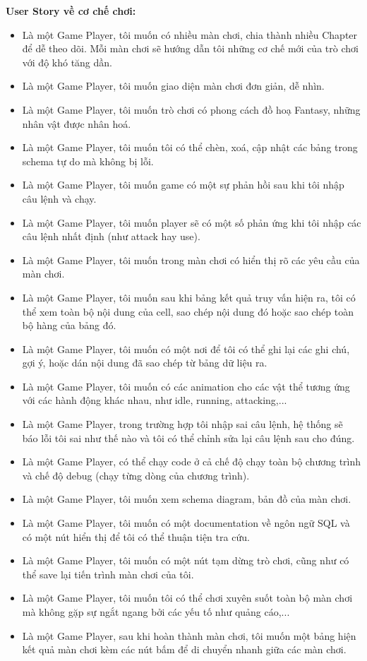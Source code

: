\textbf{User Story về cơ chế chơi:}
\begin{itemize}
	\item Là một Game Player, tôi muốn có nhiều màn chơi, chia thành nhiều Chapter để dễ theo dõi. Mỗi màn chơi sẽ hướng dẫn tôi những cơ chế mới của trò chơi với độ khó tăng dần.
	\item Là một Game Player, tôi muốn giao diện màn chơi đơn giản, dễ nhìn.
	\item Là một Game Player, tôi muốn trò chơi có phong cách đồ hoạ Fantasy, những nhân vật được nhân hoá.
	\item Là một Game Player, tôi muốn tôi có thể chèn, xoá, cập nhật các bảng trong schema tự do mà không bị lỗi.
	\item Là một Game Player, tôi muốn game có một sự phản hồi sau khi tôi nhập câu lệnh và chạy.
	\item Là một Game Player, tôi muốn player sẽ có một số phản ứng khi tôi nhập các câu lệnh nhất định (như attack hay use).
	\item Là một Game Player, tôi muốn trong màn chơi có hiển thị rõ các yêu cầu của màn chơi.
	\item Là một Game Player, tôi muốn sau khi bảng kết quả truy vấn hiện ra, tôi có thể xem toàn bộ nội dung của cell, sao chép nội dung đó hoặc sao chép toàn bộ hàng của bảng đó.
	\item Là một Game Player, tôi muốn có một nơi để tôi có thể ghi lại các ghi chú, gợi ý, hoặc dán nội dung đã sao chép từ bảng dữ liệu ra.
	\item Là một Game Player, tôi muốn có các animation cho các vật thể tương ứng với các hành động khác nhau, như idle, running, attacking,...
	\item Là một Game Player, trong trường hợp tôi nhập sai câu lệnh, hệ thống sẽ báo lỗi tôi sai như thế nào và tôi có thể chỉnh sửa lại câu lệnh sau cho đúng. 
	\item Là một Game Player, có thể chạy code ở cả chế độ chạy toàn bộ chương trình và chế độ debug (chạy từng dòng của chương trình).
	\item Là một Game Player, tôi muốn xem schema diagram, bản đồ của màn chơi.
	\item Là một Game Player, tôi muốn có một documentation về ngôn ngữ SQL và có một nút hiển thị để tôi có thể thuận tiện tra cứu.
	\item Là một Game Player, tôi muốn có một nút tạm dừng trò chơi, cũng như có thể save lại tiến trình màn chơi của tôi.
	\item Là một Game Player, tôi muốn tôi có thể chơi xuyên suốt toàn bộ màn chơi mà không gặp sự ngắt ngang bởi các yếu tố như quảng cáo,...
	\item Là một Game Player, sau khi hoàn thành màn chơi, tôi muốn một bảng hiện kết quả màn chơi kèm các nút bấm để di chuyển nhanh giữa các màn chơi.
\end{itemize}


